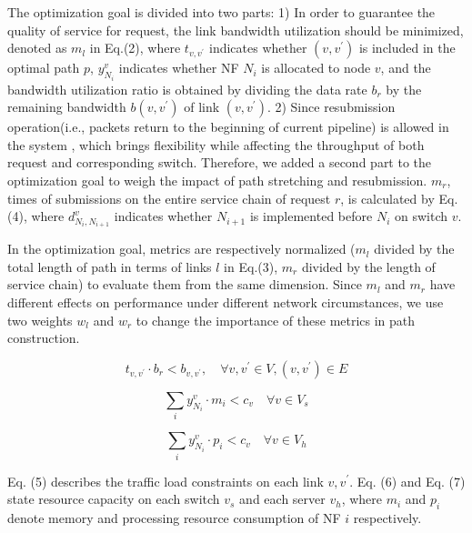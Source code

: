 \documentclass[10pt, conference, letterpaper]{IEEEtran}
\begin{document}
The optimization goal is divided into two parts: 
1) In order to guarantee the quality of service for request, the link bandwidth utilization should be minimized, denoted as $m_l$ in Eq.(2), where $t_{v,v^{\prime}}$ indicates whether $(v, v^{\prime})$ is included in the optimal path $p$, $y_{N_{i}}^{v}$ indicates whether NF $N_{i}$ is allocated to node $v$, and the bandwidth utilization ratio is obtained by dividing the data rate $b_{r}$ by the remaining bandwidth $b(v, v^{\prime})$ of link $(v, v^{\prime})$.
2) Since resubmission operation(i.e., packets return to the beginning of current pipeline) is allowed in the system , which brings flexibility while affecting the throughput of both request and corresponding switch.  Therefore, we added a second part to the optimization goal to weigh the impact of path stretching and resubmission. 
$m_{r}$, times of submissions on the entire service chain of request $r$, is calculated by Eq.(4), where $d_{N_{i}, N_{i+1}}^{v}$ indicates whether $N_{i+1}$ is implemented before $N_{i}$ on switch $v$.

In the optimization goal, metrics are respectively normalized ($m_l$ divided by the total length of path in terms of links $l$ in Eq.(3), $m_r$ divided by the length of service chain) to evaluate them from the same dimension. Since $m_l$ and $m_r$ have different effects on performance under different network circumstances, we use two weights $w_l$ and $w_r$ to change the importance of these metrics in path construction.
 


\begin{equation}
t_{v, v^{\prime}} \cdot b_{r}<b_{v, v^{\prime}}, \quad \forall v, v^{\prime} \in V, (v, v^{\prime}) \in E
\end{equation}

\begin{equation}
\sum_{i} y_{N_{i}}^{v} \cdot m_{i}<c_{v} \quad \forall v \in V_{s}
\end{equation}

\begin{equation}
\sum_{i} y_{N_{i}}^{v} \cdot p_{i}<c_{v} \quad \forall v \in V_{h}
\end{equation}

Eq. (5) describes the traffic load constraints on each link $v, v^{\prime}$. Eq. (6) and Eq. (7) state resource capacity on each switch $v_s$ and each server $v_h$, where $m_i$ and $p_i$ denote memory and processing resource consumption of NF $i$ respectively.
\end{document}
